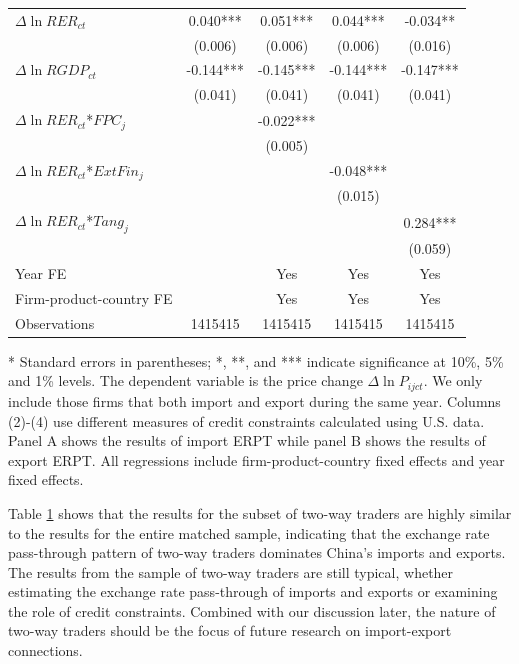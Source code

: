 \documentclass[12pt]{article}
\begin{document}
\begin{table}[htbp]
\begin{threeparttable}
\begin{tabular}{lcccc}
		\midrule
		$\Delta \ln RER_{ct}$ & 0.040*** & 0.051*** & 0.044*** & -0.034** \\
		& (0.006) & (0.006) & (0.006) & (0.016) \\
		$\Delta \ln RGDP_{ct}$ & -0.144*** & -0.145*** & -0.144*** & -0.147*** \\
		& (0.041) & (0.041) & (0.041) & (0.041) \\
		$\Delta \ln RER_{ct}$*$FPC_{j}$ &       & -0.022*** &       &  \\
		&       & (0.005) &       &  \\
		$\Delta \ln RER_{ct}$*$ExtFin_{j}$ &       &       & -0.048*** &  \\
		&       &       & (0.015) &  \\
		$\Delta \ln RER_{ct}$*$Tang_{j}$ &       &       &       & 0.284*** \\
		&       &       &       & (0.059) \\
		Year FE  &       & Yes   & Yes   & Yes \\
		Firm-product-country FE &       & Yes   & Yes   & Yes \\
		Observations & 1415415 & 1415415 & 1415415 & 1415415 \\
		\bottomrule
	\end{tabular}
	
	\begin{tablenotes}
		\footnotesize
		\item[*] Standard errors in parentheses; *, **, and *** indicate significance at 10\%, 5\% and 1\% levels. The dependent variable is the price change $\Delta \ln P_{ijct}$. We only include those firms that both import and export during the same year. Columns (2)-(4) use different measures of credit constraints calculated using U.S. data. Panel A shows the results of import ERPT while panel B shows the results of export ERPT. All regressions include firm-product-country fixed effects and year fixed effects.
	\end{tablenotes}
	\end{threeparttable}
        \label{tab.alt.twoway}
\end{table}

Table \ref{tab.alt.twoway} shows that the results for the subset of two-way traders are highly similar to the results for the entire matched sample, indicating that the exchange rate pass-through pattern of two-way traders dominates China’s imports and exports. The results from the sample of two-way traders are still typical, whether estimating the exchange rate pass-through of imports and exports or examining the role of credit constraints. Combined with our discussion later, the nature of two-way traders should be the focus of future research on import-export connections.
\end{document}
